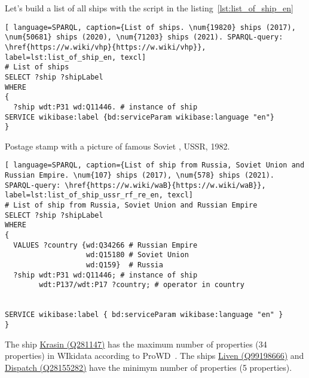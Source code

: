 Let's build a list of all ships with the script in the listing~\ref{lst:list_of_ship_en}


\begin{lstlisting}[ language=SPARQL, caption={List of ships. \num{19820} ships (2017), \num{50681} ships (2020), \num{71203} ships (2021). SPARQL-query: \href{https://w.wiki/vhp}{https://w.wiki/vhp}}, label=lst:list_of_ship_en, texcl]
# List of ships
SELECT ?ship ?shipLabel
WHERE
{
  ?ship wdt:P31 wd:Q11446. # instance of ship
SERVICE wikibase:label {bd:serviceParam wikibase:language "en"}
}
\end{lstlisting}


\begin{marginfigure}[0.0cm]
  {
    \setlength{\fboxsep}{0pt}%
    \setlength{\fboxrule}{1pt}%
  }
  \caption[Soviet destroyer project 7]{Postage stamp with a picture of famous Soviet , USSR, 1982.}%
  \label{fig:quiz_question_ship}%
\end{marginfigure}
  
\begin{lstlisting}[ language=SPARQL, caption={List of ship from Russia, Soviet Union and Russian Empire. \num{107} ships (2017), \num{578} ships (2021). SPARQL-query: \href{https://w.wiki/waB}{https://w.wiki/waB}}, label=lst:list_of_ship_ussr_rf_re_en, texcl]
# List of ship from Russia, Soviet Union and Russian Empire
SELECT ?ship ?shipLabel
WHERE
{
  VALUES ?country {wd:Q34266 # Russian Empire
                   wd:Q15180 # Soviet Union
                   wd:Q159}  # Russia
  ?ship wdt:P31 wd:Q11446; # instance of ship
        wdt:P137/wdt:P17 ?country; # operator in country
      
  
SERVICE wikibase:label { bd:serviceParam wikibase:language "en" }
}
\end{lstlisting}

\label{question:ship_1}

The ship \href{https://www.wikidata.org/wiki/Q281147}{Krasin (Q281147)} has the maximum number of properties (34 properties) in WIkidata according to ProWD~. The ships \href{https://www.wikidata.org/wiki/Q99198666}{Liven (Q99198666)} and \href{https://www.wikidata.org/wiki/Q28155282}{Dispatch (Q28155282)} have the minimym number of properties (5 properties).


